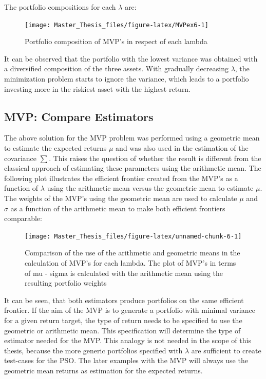 \documentclass[
  oneside, a4paper, 12pt, openany]{book}
\theoremstyle{definition}
\theoremstyle{definition}
\theoremstyle{definition}
\theoremstyle{definition}
\theoremstyle{remark}
\begin{document}
The portfolio compositions for each \(\lambda\) are:

\begin{figure}[H]
\texttt{[image: Master\_Thesis\_files/figure-latex/MVPex6-1]} \caption{Portfolio composition of MVP's in respect of each lambda}\label{fig:MVPex6}
\end{figure}

It can be observed that the portfolio with the lowest variance was obtained with a diversified composition of the three assets. With gradually decreasing \(\lambda\), the minimization problem starts to ignore the variance, which leads to a portfolio investing more in the riskiest asset with the highest return.

\hypertarget{mvp-compare-estimators}{%
\subsection{MVP: Compare Estimators}\label{mvp-compare-estimators}}

The above solution for the MVP problem was performed using a geometric mean to estimate the expected returns \(\mu\) and was also used in the estimation of the covariance \(\textstyle\sum\). This raises the question of whether the result is different from the classical approach of estimating these parameters using the arithmetic mean. The following plot illustrates the efficient frontier created from the MVP's as a function of \(\lambda\) using the arithmetic mean versus the geometric mean to estimate \(\mu\). The weights of the MVP's using the geometric mean are used to calculate \(\mu\) and \(\sigma\) as a function of the arithmetic mean to make both efficient frontiers comparable:

\begin{figure}[H]
\texttt{[image: Master\_Thesis\_files/figure-latex/unnamed-chunk-6-1]} \caption{Comparison of the use of the arithmetic and geometric means in the calculation of MVP's for each lambda. The plot of MVP's in terms of mu - sigma is calculated with the arithmetic mean using the resulting portfolio weights}\label{fig:unnamed-chunk-6}
\end{figure}

It can be seen, that both estimators produce portfolios on the same efficient frontier. If the aim of the MVP is to generate a portfolio with minimal variance for a given return target, the type of return needs to be specified to use the geometric or arithmetic mean. This specification will determine the type of estimator needed for the MVP. This analogy is not needed in the scope of this thesis, because the more generic portfolios specified with \(\lambda\) are sufficient to create test-cases for the PSO. The later examples with the MVP will always use the geometric mean returns as estimation for the expected returns.
\end{document}
